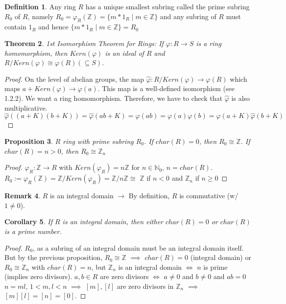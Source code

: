 \documentclass[11pt]{article}
\newtheorem{thm}{Theorem}[section]
\newtheorem{prop}[thm]{Proposition}
\newtheorem{cor}[thm]{Corollary}
\theoremstyle{definition}
\newtheorem{definition}[thm]{Definition}
\newtheorem{remark}[thm]{Remark}
\numberwithin{equation}{section}
\newcommand{\Z}{\mathbb{Z}}
\newcommand{\N}{\mathbb{N}} %
\begin{document}
\begin{definition}
Any ring $R$ has a unique smallest subring called the prime subring $R_{0}$ of $R$, namely $R_{0} = \varphi_{R}(\Z) = \{m*1_{R} \mid m \in \Z\}$ and any subring of $R$ must contain $1_{R}$ and hence $\{m*1_{R} \mid m \in \Z\} = R_{0}$
\end{definition}

\begin{thm}{1st Isomorphism Theorem for Rings:}
If $\varphi:R \rightarrow S$ is a ring homomorphism, then $Kern(\varphi)$ is an ideal of $R$ and $R/Kern(\varphi) \cong \varphi(R) (\subseteq S)$.
\end{thm}

\begin{proof}
On the level of abelian groups, the map $\hat{\varphi}: R/Kern(\varphi) \rightarrow \varphi(R)$ which maps $a+Kern(\varphi) \rightarrow \varphi(a)$. This map is a well-defined isomorphism (see 1.2.2). We want a ring homomorphism. Therefore, we have to check that $\hat{\varphi}$ is also multiplicative. $\hat{\varphi}((a+K)(b+K)) = \hat{\varphi}(ab + K) = \varphi(ab) = \varphi(a)\varphi(b) = \hat{\varphi}(a+K)\hat{\varphi}(b+K)$
\end{proof}

\begin{prop}
$R$ ring with prime subring $R_{0}$. If $char(R) = 0$, then $R_{0} \cong \Z$. If $char(R) = n > 0$, then $R_{0} \cong \Z_{n}$
\end{prop}

\begin{proof}
$\varphi_{R}: \Z \rightarrow R$ with $Kern(\varphi_{R}) = n\Z$ for $n  \in \N_{0}$, $n = char(R)$. $R_{0} := \varphi_{R}(\Z) = \Z/Kern(\varphi_{R}) = \Z/n\Z \cong $ $\Z$ if $n < 0$ and $\Z_{n}$ if $n \geq 0$
\end{proof}

\begin{remark}
$R$ is an integral domain $\rightarrow$ By definition, $R$ is commutative (w/ $1 \neq 0$).
\end{remark}

\begin{cor}
If $R$ is an integral domain, then either $char(R) = 0$ or $char(R)$ is a prime number.
\end{cor}

\begin{proof}
$R_{0}$, as a subring of an integral domain must be an integral domain itself. But by the previous proposition, $R_{0} \cong \Z$ $\implies$ $char(R) = 0$ (integral domain) or $R_{0} \cong \Z_{n}$ with $char(R) = n$, but $\Z_{n}$ is an integral domain $\Leftrightarrow$ $n$ is prime (implies zero divisors). $a, b \in R$ are zero divisors $\Leftrightarrow$ $a \neq 0$ and $b \neq 0$ and $ab = 0$ $n = ml$, $1<m, l<n$ $\implies$ $[m], [l]$ are zero divisors in $\Z_{n}$ $\implies$ $[m][l] = [n] = [0]$.
\end{proof}
\end{document}
